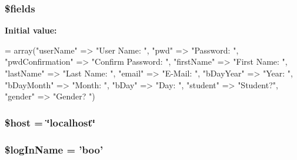 \hypertarget{_m_c_mcreate_new_account_validator_8php_ab2303c817e3b402b77b7f99627b9c319}{
\subsubsection[{\$fields}]{\setlength{\rightskip}{0pt plus 5cm}\$fields}}\label{_m_c_mcreate_new_account_validator_8php_ab2303c817e3b402b77b7f99627b9c319}
{\bfseries Initial value\-:}
\begin{DoxyCode}
= array(\textcolor{stringliteral}{"userName"} => \textcolor{stringliteral}{"User Name: "},
                        \textcolor{stringliteral}{"pwd"} => \textcolor{stringliteral}{"Password: "},
                        \textcolor{stringliteral}{"pwdConfirmation"} => \textcolor{stringliteral}{"Confirm Password: "},
                        \textcolor{stringliteral}{"firstName"} => \textcolor{stringliteral}{"First Name: "},
                        \textcolor{stringliteral}{"lastName"} => \textcolor{stringliteral}{"Last Name: "},
                        \textcolor{stringliteral}{"email"} => \textcolor{stringliteral}{"E-Mail: "},
                        \textcolor{stringliteral}{"bDayYear"} => \textcolor{stringliteral}{"Year: "},
                        \textcolor{stringliteral}{"bDayMonth"} => \textcolor{stringliteral}{"Month: "},
                        \textcolor{stringliteral}{"bDay"} => \textcolor{stringliteral}{"Day: "},
                        \textcolor{stringliteral}{"student"} => \textcolor{stringliteral}{"Student?"},
                        \textcolor{stringliteral}{"gender"} => \textcolor{stringliteral}{"Gender? "})
\end{DoxyCode}
\hypertarget{_m_c_mcreate_new_account_validator_8php_a711797613cb863ca0756df789c396bf2}{
\subsubsection[{\$host}]{\setlength{\rightskip}{0pt plus 5cm}\$host = \char`\"{}localhost\char`\"{}}}\label{_m_c_mcreate_new_account_validator_8php_a711797613cb863ca0756df789c396bf2}
\hypertarget{_m_c_mcreate_new_account_validator_8php_a30b110afa9d5bd2d01ba8f74a46d2b3f}{
\subsubsection[{\$log\-In\-Name}]{\setlength{\rightskip}{0pt plus 5cm}\$log\-In\-Name = 'boo'}}\label{_m_c_mcreate_new_account_validator_8php_a30b110afa9d5bd2d01ba8f74a46d2b3f}
